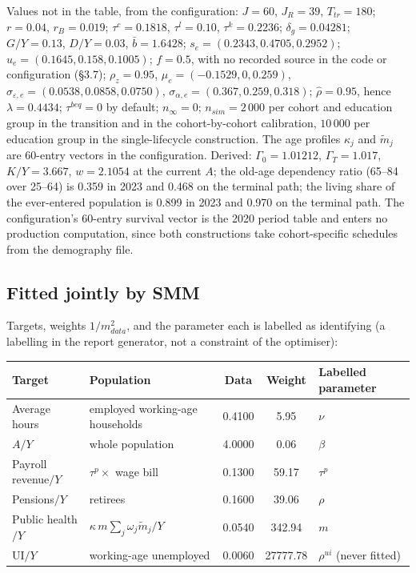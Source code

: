\documentclass[11pt,a4paper]{article}
\begin{document}
Values not in the table, from the configuration: $J = 60$, $J_R = 39$, $T_{tr} = 180$; $r = 0.04$, $r_B = 0.019$; $\tau^c = 0.1818$, $\tau^l = 0.10$, $\tau^k = 0.2236$; $\delta_g = 0.04281$; $G/Y = 0.13$, $D/Y = 0.03$, $\bar b = 1.6428$; $s_e = (0.2343, 0.4705, 0.2952)$; $u_e = (0.1645, 0.158, 0.1005)$; $f = 0.5$, with no recorded source in the code or configuration (\S3.7); $\rho_z = 0.95$, $\mu_e = (-0.1529, 0, 0.259)$, $\sigma_{\varepsilon,e} = (0.0538, 0.0858, 0.0750)$, $\sigma_{\alpha,e} = (0.367, 0.259, 0.318)$; $\hat\rho = 0.95$, hence $\lambda = 0.4434$; $\tau^{beq} = 0$ by default; $n_\infty = 0$; $n_{sim} = 2\,000$ per cohort and education group in the transition and in the cohort-by-cohort calibration, $10\,000$ per education group in the single-lifecycle construction. The age profiles $\kappa_j$ and $\tilde m_j$ are 60-entry vectors in the configuration. Derived: $\Gamma_0 = 1.01212$, $\Gamma_T = 1.017$, $K/Y = 3.667$, $w = 2.1054$ at the current $A$; the old-age dependency ratio (65--84 over 25--64) is 0.359 in 2023 and 0.468 on the terminal path; the living share of the ever-entered population is 0.899 in 2023 and 0.970 on the terminal path. The configuration's 60-entry survival vector is the 2020 period table and enters no production computation, since both constructions take cohort-specific schedules from the demography file.

\subsection{Fitted jointly by SMM}

Targets, weights $1/m^2_{data}$, and the parameter each is labelled as identifying (a labelling in the report generator, not a constraint of the optimiser):

\begin{center}\footnotesize
\begin{tabular}{@{}llS[table-format=1.4]S[table-format=5.2]l@{}}
\toprule
Target & Population & {Data} & {Weight} & Labelled parameter \\
\midrule
Average hours & employed working-age households & 0.4100 & 5.95 & $\nu$ \\
$A/Y$ & whole population & 4.0000 & 0.06 & $\beta$ \\
Payroll revenue$/Y$ & $\tau^p \times$ wage bill & 0.1300 & 59.17 & $\tau^p$ \\
Pensions$/Y$ & retirees & 0.1600 & 39.06 & $\rho$ \\
Public health$/Y$ & $\kappa\, m \sum_j \omega_j \tilde m_j / Y$ & 0.0540 & 342.94 & $m$ \\
UI$/Y$ & working-age unemployed & 0.0060 & 27777.78 & $\rho^{ui}$ (never fitted) \\
\bottomrule
\end{tabular}
\end{center}
\end{document}
